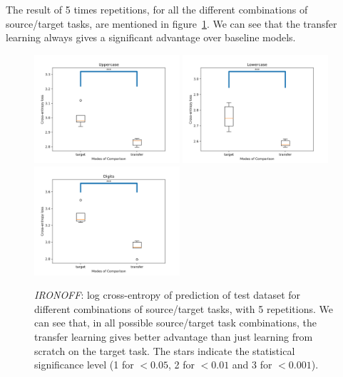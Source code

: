       The result of 5 times repetitions, for all the different combinations of source/target tasks, are mentioned in figure~\ref{fig:ironoff_crossentropy}. We can see that the transfer learning always gives a significant advantage over baseline models.
      \begin{figure}
        \centering
          \includegraphics[width=0.48\textwidth]{images/sota/ironoff_results/Uppercase.png}\quad
          \includegraphics[width=0.48\textwidth]{images/sota/ironoff_results/Lowercase.png}\quad
          \includegraphics[width=0.48\textwidth]{images/sota/ironoff_results/Digits.png}
        \caption[\textit{IRONOFF} - log cross-entropy of prediction results for different tasks]{\textit{IRONOFF}: log cross-entropy of prediction of test dataset for different combinations of source/target tasks, with 5 repetitions. We can see that, in all possible source/target task combinations, the transfer learning gives better advantage than just learning from scratch on the target task. The stars indicate the statistical significance level (1 for $<0.05$, 2 for $<0.01$ and 3 for $<0.001$).}
        \label{fig:ironoff_crossentropy}
      \end{figure}

